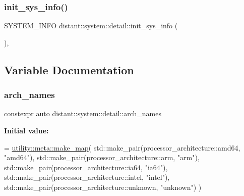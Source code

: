 \mbox{\label{namespacedistant_1_1system_1_1detail_ac887ec70d624331d3e4d6edca2770f63}} 
\subsubsection{\texorpdfstring{init\+\_\+sys\+\_\+info()}{init\_sys\_info()}}
{\footnotesize\ttfamily S\+Y\+S\+T\+E\+M\+\_\+\+I\+N\+FO distant\+::system\+::detail\+::init\+\_\+sys\+\_\+info (\begin{DoxyParamCaption}{ }\end{DoxyParamCaption})\hspace{0.3cm}{\ttfamily [inline]}, {\ttfamily [noexcept]}}



\subsection{Variable Documentation}
\mbox{\label{namespacedistant_1_1system_1_1detail_aed72f4bdd1952c37cc2cdb3c618c3e86}} 
\subsubsection{\texorpdfstring{arch\+\_\+names}{arch\_names}}
{\footnotesize\ttfamily constexpr auto distant\+::system\+::detail\+::arch\+\_\+names}

{\bfseries Initial value\+:}
\begin{DoxyCode}
= \mbox{\hyperlink{namespacedistant_1_1utility_1_1meta_ad53bb77fc3e8c9138d6bb147cd9f4708}{utility::meta::make\_map}}(
            std::make\_pair(processor\_architecture::amd64, \textcolor{stringliteral}{"amd64"}),
            std::make\_pair(processor\_architecture::arm, \textcolor{stringliteral}{"arm"}),
            std::make\_pair(processor\_architecture::ia64, \textcolor{stringliteral}{"ia64"}),
            std::make\_pair(processor\_architecture::intel, \textcolor{stringliteral}{"intel"}),
            std::make\_pair(processor\_architecture::unknown, \textcolor{stringliteral}{"unknown"})
        )
\end{DoxyCode}
